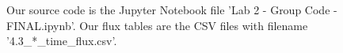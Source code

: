 \documentclass[twocolumn]{aastex631}
\begin{document}
Our source code is the Jupyter Notebook file 'Lab 2 - Group Code - FINAL.ipynb'. Our flux tables are the CSV files with filename '4.3\_*\_time\_flux.csv'.




{}



\end{document}
